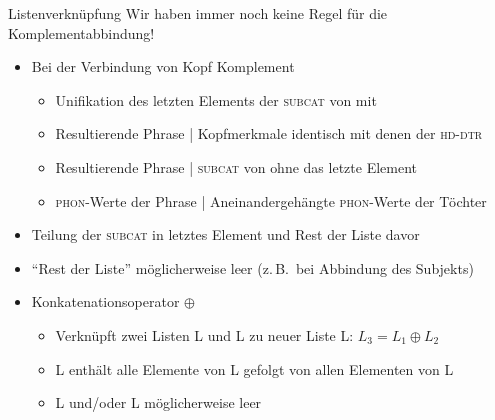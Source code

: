 \begin{frame}
  {Listenverknüpfung}
  \onslide<+->
  \onslide<+->
  Wir haben immer noch keine \alert{Regel} für die Komplementabbindung!\\
  \Zeile
  \begin{itemize}[<+->]
    \item Bei der Verbindung von Kopf  Komplement 
      \begin{itemize}[<+->]
        \item Unifikation des \alert{letzten Elements der \textsc{subcat} von } mit 
        \item Resultierende Phrase | Kopfmerkmale identisch mit denen der \textsc{hd-dtr}
        \item Resultierende Phrase | \textsc{subcat} von  \alert{ohne das letzte Element}
        \item \textsc{phon}-Werte der Phrase | \alert{Aneinandergehängte \textsc{phon}-Werte} der Töchter
      \end{itemize}
      \Halbzeile
    \item Teilung der \textsc{subcat} in \alert{letztes Element} und \alert{Rest der Liste davor}
    \item \alert{"`Rest der Liste"' möglicherweise leer} (z.\,B.\ bei Abbindung des Subjekts)
      \Halbzeile
    \item \alert{Konkatenationsoperator $\oplus$}
        \begin{itemize}[<+->]
          \item Verknüpft zwei Listen L und L zu neuer Liste L: \alert{$L_3=L_1\oplus L_2$}
          \item L enthält alle Elemente von L gefolgt von allen Elementen von L
          \item L und\slash oder L möglicherweise leer
        \end{itemize}
  \end{itemize}
\end{frame}

